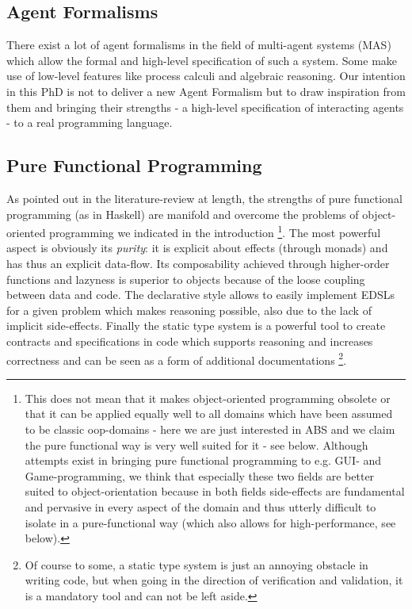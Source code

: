 \subsection{Agent Formalisms}
There exist a lot of agent formalisms in the field of multi-agent systems (MAS) which allow the formal and high-level specification of such a system. Some make use of low-level features like process calculi and algebraic reasoning. Our intention in this PhD is not to deliver a new Agent Formalism but to draw inspiration from them and bringing their strengths - a high-level specification of interacting agents - to a real programming language. 

\subsection{Pure Functional Programming}
As pointed out in the literature-review at length, the strengths of pure functional programming (as in Haskell) are manifold and overcome the problems of object-oriented programming we indicated in the introduction \footnote{This does not mean that it makes object-oriented programming obsolete or that it can be applied equally well to all domains which have been assumed to be classic oop-domains - here we are just interested in ABS and we claim the pure functional way is very well suited for it - see below. Although attempts exist in bringing pure functional programming to e.g. GUI- and Game-programming, we think that especially these two fields are better suited to object-orientation because in both fields side-effects are fundamental and pervasive in every aspect of the domain and thus utterly difficult to isolate in a pure-functional way (which also allows for high-performance, see below).}. The most powerful aspect is obviously its \textit{purity}: it is explicit about effects (through monads) and has thus an explicit data-flow. Its composability achieved through higher-order functions and lazyness is superior to objects because of the loose coupling between data and code. The declarative style allows to easily implement EDSLs for a given problem which makes reasoning possible, also due to the lack of implicit side-effects. Finally the static type system is a powerful tool to create contracts and specifications in code which supports reasoning and increases correctness and can be seen as a form of additional documentations \footnote{Of course to some, a static type system is just an annoying obstacle in writing code, but when going in the direction of verification and validation, it is a mandatory tool and can not be left aside.}.

